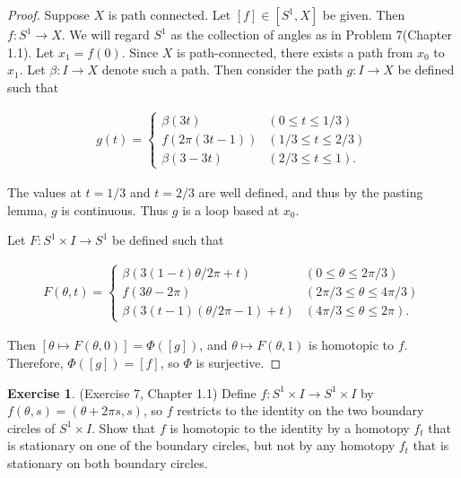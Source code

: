 \documentclass[12pt, psamsfonts]{amsart}
\theoremstyle{definition}
\newtheorem{exer}[thm]{Exercise}
\theoremstyle{remark}
\numberwithin{equation}{section}
\begin{document}
\begin{proof}
  Suppose $X$ is path connected.
  Let $[f] \in [S^1, X]$ be given.
  Then $f: S^1 \rightarrow X$.
  We will regard $S^1$ as the collection of angles as in Problem 7(Chapter 1.1).
  Let $x_1 = f(0)$.
  Since $X$ is path-connected, there exists a path from $x_0$ to $x_1$.
  Let $\beta: I \rightarrow X$ denote such a path.
  Then consider the path $g: I \rightarrow X$ be defined such that

  \begin{align*}
    g(t) = \begin{cases}
      \beta(3t) & (0 \leq t \leq 1 / 3) \\
      f(2\pi(3t - 1)) & (1 / 3 \leq t \leq 2 / 3) \\
      \beta(3 - 3t) & (2/3 \leq t \leq 1).
    \end{cases}
  \end{align*}

  The values at $t = 1/3$ and $t = 2/3$ are well defined, and thus by the pasting lemma, $g$ is continuous.
  Thus $g$ is a loop based at $x_0$.

  Let $F: S^1 \times I \rightarrow S^1$ be defined such that

  \begin{align*}
    F(\theta, t) = \begin{cases}
      \beta(3(1 - t)\theta/2\pi + t) & (0 \leq \theta \leq 2\pi / 3) \\
      f(3\theta - 2\pi) & (2\pi / 3 \leq \theta \leq 4\pi / 3) \\
      \beta(3(t - 1)(\theta / 2\pi - 1) + t) & (4\pi/3 \leq \theta \leq 2\pi).
    \end{cases}
  \end{align*}

  Then $[\theta \mapsto F(\theta, 0)] = \Phi([g])$, and $\theta \mapsto F(\theta, 1)$ is homotopic to $f$.
  Therefore, $\Phi([g]) = [f]$, so $\Phi$ is surjective.
\end{proof}

\begin{exer}{(Exercise 7, Chapter 1.1)}
  Define $f: S^1 \times I \rightarrow S^1 \times I$ by $f(\theta, s) = (\theta + 2\pi s, s)$, so $f$ restricts to the identity on the two boundary circles of $S^1 \times I$.
  Show that $f$ is homotopic to the identity by a homotopy $f_t$ that is stationary on one of the boundary circles, but not by any homotopy $f_t$ that is stationary on both boundary circles.
\end{exer}
\end{document}

